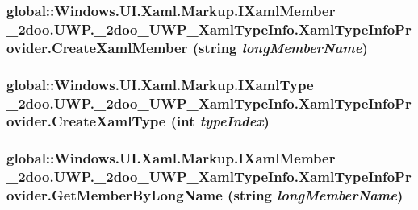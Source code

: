 \hypertarget{class__2doo_1_1_u_w_p_1_1__2doo___u_w_p___xaml_type_info_1_1_xaml_type_info_provider_a54d549bb3ab97a5fa9525ad7c516602}{
\subsubsection[{CreateXamlMember}]{\setlength{\rightskip}{0pt plus 5cm}global::Windows.UI.Xaml.Markup.IXamlMember \_\-2doo.UWP.\_\-2doo\_\-UWP\_\-XamlTypeInfo.XamlTypeInfoProvider.CreateXamlMember (string {\em longMemberName})}}
\label{class__2doo_1_1_u_w_p_1_1__2doo___u_w_p___xaml_type_info_1_1_xaml_type_info_provider_a54d549bb3ab97a5fa9525ad7c516602}


\hypertarget{class__2doo_1_1_u_w_p_1_1__2doo___u_w_p___xaml_type_info_1_1_xaml_type_info_provider_1006eb0b6ffa687ece81f28915b7827a}{
\subsubsection[{CreateXamlType}]{\setlength{\rightskip}{0pt plus 5cm}global::Windows.UI.Xaml.Markup.IXamlType \_\-2doo.UWP.\_\-2doo\_\-UWP\_\-XamlTypeInfo.XamlTypeInfoProvider.CreateXamlType (int {\em typeIndex})}}
\label{class__2doo_1_1_u_w_p_1_1__2doo___u_w_p___xaml_type_info_1_1_xaml_type_info_provider_1006eb0b6ffa687ece81f28915b7827a}


\hypertarget{class__2doo_1_1_u_w_p_1_1__2doo___u_w_p___xaml_type_info_1_1_xaml_type_info_provider_8a8e3e5e3af2fe644249248cc71eae80}{
\subsubsection[{GetMemberByLongName}]{\setlength{\rightskip}{0pt plus 5cm}global::Windows.UI.Xaml.Markup.IXamlMember \_\-2doo.UWP.\_\-2doo\_\-UWP\_\-XamlTypeInfo.XamlTypeInfoProvider.GetMemberByLongName (string {\em longMemberName})}}
\label{class__2doo_1_1_u_w_p_1_1__2doo___u_w_p___xaml_type_info_1_1_xaml_type_info_provider_8a8e3e5e3af2fe644249248cc71eae80}


